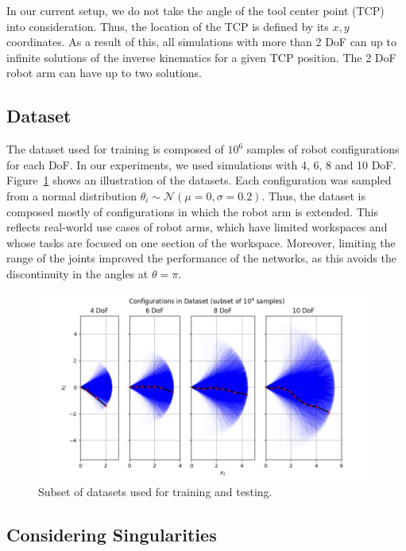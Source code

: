 \documentclass[conference]{IEEEtran}
\begin{document}
In our current setup, we do not take the angle of the tool center point (TCP) into consideration. Thus, the location of the TCP is defined by its \( x, y \) coordinates. As a result of this, all simulations with more than 2 DoF can up to infinite solutions of the inverse kinematics for a given TCP position. The 2 DoF robot arm can have up to two solutions.

\subsection*{Dataset}

The dataset used for training is composed of \( 10^6 \) samples of robot configurations for each DoF. In our experiments, we used simulations with 4, 6, 8 and 10 DoF. Figure~\ref{fig:datasets} shows an illustration of the datasets. Each configuration was sampled from a normal distribution \( \theta_i \sim \mathcal{N}(\mu=0, \sigma=0.2) \). Thus, the dataset is composed mostly of configurations in which the robot arm is extended. This reflects real-world use cases of robot arms, which have limited workspaces and whose tasks are focused on one section of the workspace. Moreover, limiting the range of the joints improved the performance of the networks, as this avoids the discontinuity in the angles at \( \theta = \pi \).

\begin{figure}[!ht]
    \centering
    \includegraphics[width=\linewidth]{figures/normal_std_0.2_all_DoF.jpg}
    \caption{Subset of datasets used for training and testing.}
    \label{fig:datasets} 
\end{figure}

\subsection*{Considering Singularities}
\end{document}
